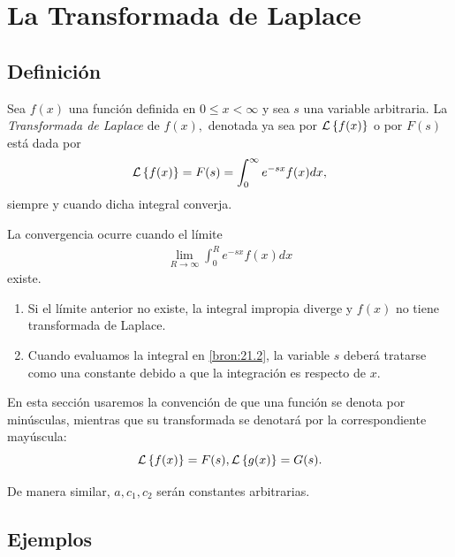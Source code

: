 
%


\section{La Transformada de Laplace}

\subsection{Definici\'on}


 Sea $f(x)$ una funci\'on definida en $0\leq x < \infty$ y sea $s$ una variable arbitraria.  La \emph{Transformada de Laplace} de $f(x),$ denotada ya sea por $\mathcal{L}\left\{ f(x) \right\}$ o por $F(s)$ está dada por
 \begin{equation}
  \label{bron:21.1}
  \mathcal{L}\left\{ f(x) \right\}=F(s)=\int_{0}^{\infty}e^{-sx}f(x)dx,
 \end{equation}
siempre y cuando dicha integral converja.


{}
La convergencia ocurre cuando el límite
\begin{align}
\label{bron:21.2}
\lim_{R\to \infty}
\int_{0}^{R} e^{-sx}f(x)dx
\end{align}
existe.

{}
\begin{rem}
 \begin{enumerate}
  \item Si el límite anterior no existe, la integral impropia diverge y $f(x)$ no tiene transformada de Laplace.
  \item Cuando evaluamos la integral en \eqref{bron:21.2}, la variable $s$ deberá tratarse como una constante debido a que la integración es respecto de $x.$
 \end{enumerate}

\end{rem}




 En esta secci\'on usaremos la convención de que una función se denota por minúsculas, mientras que su transformada se denotará por la correspondiente mayúscula:
 $$\mathcal{L}\left\{ f(x) \right\}=F(s),\mathcal{L}\left\{ g(x) \right\}=G(s).$$

 De manera similar, $a,c_{1},c_{2}$ serán constantes arbitrarias.


\subsection{Ejemplos}


